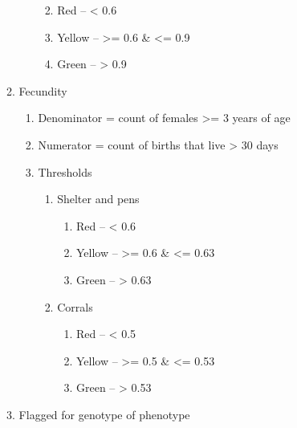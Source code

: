 \documentclass[
]{article}
\providecommand{\tightlist}{%
  \setlength{\itemsep}{0pt}\setlength{\parskip}{0pt}}
\begin{document}
\begin{enumerate}
\begin{enumerate}
\begin{enumerate}
      \begin{enumerate}
      \def\labelenumiv{\arabic{enumiv}.}
      \tightlist
      \item
        Red -- \textless{} 0.6
      \item
        Yellow -- \textgreater= 0.6 \& \textless= 0.9
      \item
        Green -- \textgreater{} 0.9
      \end{enumerate}
    \end{enumerate}
  \item
    Fecundity

    \begin{enumerate}
    \def\labelenumiii{\arabic{enumiii}.}
    \tightlist
    \item
      Denominator = count of females \textgreater= 3 years of age
    \item
      Numerator = count of births that live \textgreater{} 30 days
    \item
      Thresholds

      \begin{enumerate}
      \def\labelenumiv{\arabic{enumiv}.}
      \tightlist
      \item
        Shelter and pens

        \begin{enumerate}
        \def\labelenumv{\arabic{enumv}.}
        \tightlist
        \item
          Red -- \textless{} 0.6
        \item
          Yellow -- \textgreater= 0.6 \& \textless= 0.63
        \item
          Green -- \textgreater{} 0.63
        \end{enumerate}
      \item
        Corrals

        \begin{enumerate}
        \def\labelenumv{\arabic{enumv}.}
        \tightlist
        \item
          Red -- \textless{} 0.5
        \item
          Yellow -- \textgreater= 0.5 \& \textless= 0.53
        \item
          Green -- \textgreater{} 0.53
        \end{enumerate}
      \end{enumerate}
    \end{enumerate}
  \item
    Flagged for genotype of phenotype


\end{enumerate}
\end{enumerate}
\end{document}
